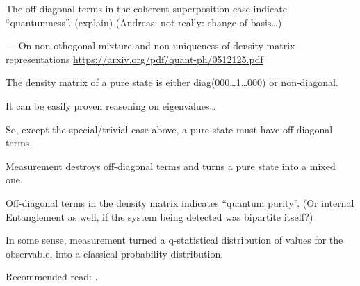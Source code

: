 The off-diagonal terms in the coherent superposition case indicate
``quantumness''. (explain) (Andreas: not really: change of basis\dots)

--- On non-othogonal mixture and non uniqueness of density matrix representations
\url{https://arxiv.org/pdf/quant-ph/0512125.pdf}

\begin{remark}
  The density matrix of a pure state is either diag(000\dots1\dots000) or non-diagonal.

  It can be easily proven reasoning on eigenvalues\dots

  So, except the special/trivial case above, a pure state must have off-diagonal terms.
\end{remark}

Measurement destroys off-diagonal terms and turns a pure state into a mixed one.

Off-diagonal terms in the density matrix indicates ``quantum purity''.
(Or internal Entanglement as well, if the system being detected was bipartite itself?)

In some sense, measurement turned a q-statistical distribution of values for the observable,
into a classical probability distribution.

Recommended read: \cite{Zurek_Decoherence, Zurek_Fundamentals}.
